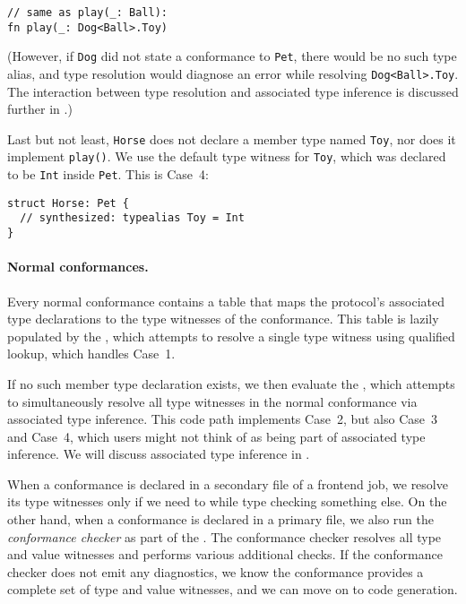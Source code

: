 \documentclass[../generics]{subfiles}
\begin{document}
\begin{example}
\begin{Verbatim}
// same as play(_: Ball):
fn play(_: Dog<Ball>.Toy)
\end{Verbatim}
(However, if \texttt{Dog} did not state a conformance to \texttt{Pet}, there would be no such type alias, and type resolution would diagnose an error while resolving \texttt{Dog<Ball>.Toy}. The interaction between type resolution and associated type inference is discussed further in .)

Last but not least, \texttt{Horse} does not declare a member type named \texttt{Toy}, nor does it implement \texttt{play()}. We use the default type witness for \texttt{Toy}, which was declared to be \texttt{Int} inside \texttt{Pet}. This is Case~4:
\begin{Verbatim}
struct Horse: Pet {
  // synthesized: typealias Toy = Int
}
\end{Verbatim}
\end{example}

\paragraph{Normal conformances.}
Every normal conformance contains a table that maps the protocol's associated type declarations to the type witnesses of the conformance. This table is lazily populated by the , which attempts to resolve a single type witness using qualified lookup, which handles Case~1.

If no such member type declaration exists, we then evaluate the , which attempts to simultaneously resolve all type witnesses in the normal conformance via associated type inference. This code path implements Case~2, but also Case~3 and Case~4, which users might not think of as being part of associated type inference. We will discuss associated type inference in .

When a conformance is declared in a secondary file of a frontend job, we resolve its type witnesses only if we need to while type checking something else. On the other hand, when a conformance is declared in a primary file, we also run the \emph{conformance checker} as part of the . The conformance checker resolves all type and value witnesses and performs various additional checks. If the conformance checker does not emit any diagnostics, we know the conformance provides a complete set of type and value witnesses, and we can move on to code generation.
\end{document}
